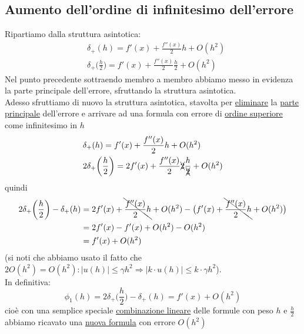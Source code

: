 \subsection{Aumento dell'ordine di infinitesimo dell'errore}
Ripartiamo dalla struttura asintotica:
\begin{equation*}
    \begin{split}
        & \delta_+(h) = f'(x) + \frac{f''(x)}{2}h + O(h^2) \\
        & \delta_+\biggl(\frac{h}{2}\biggr) = f'(x) + \frac{f''(x)}{2}\frac{h}{2} + O(h^2)
    \end{split}
\end{equation*}
Nel punto precedente sottraendo membro a membro abbiamo messo in evidenza la parte principale dell'errore, sfruttando la struttura asintotica.\\
Adesso sfruttiamo di nuovo la struttura asintotica, stavolta
per \uline{eliminare} la \uline{parte principale} dell'errore e arrivare ad una formula con errore di \uline{ordine superiore} come infinitesimo in $h$
\begin{equation*}
    \begin{split}
        & \delta_+(h) = f'(x) + \frac{f''(x)}{2}h + O(h^2) \\
        & 2\delta_+\biggl(\frac{h}{2}\biggr) = 2f'(x) + \frac{f''(x)}{2}\xcancel{2}\frac{h}{\xcancel{2}} + O(h^2)
    \end{split}
\end{equation*}
quindi
\begin{equation*}
    \begin{split}
        2\delta_+ \biggl(\frac{h}{2}\biggr) - \delta_+(h) & = 2f'(x)+\bcancel{\frac{f''(x)}{2}h} + O(h^2) - \bigl(f'(x) + \bcancel{\frac{f''(x)}{2}h} + O(h^2) \bigr) \\
        & = 2f'(x) - f'(x) + O(h^2) - O(h^2) \\
        & = f'(x)+O(h^2)
    \end{split}
\end{equation*}
(si noti che abbiamo usato il fatto che $2O(h^2) = O(h^2) : |u(h)|\leq\gamma h^2 \Rightarrow |k\cdot u(h)|\leq k\cdot\gamma h^2$).\\
In definitiva:
\begin{equation*}
    \phi_1(h) = 2\delta_+ \biggl(\frac{h}{2}\biggr) - \delta_+(h) = f'(x)+O(h^2)
\end{equation*}
cioè con una semplice speciale \uline{combinazione lineare} delle formule con peso $h$ e $\frac{h}{2}$ abbiamo ricavato una \uline{nuova formula} con errore $O(h^2)$
